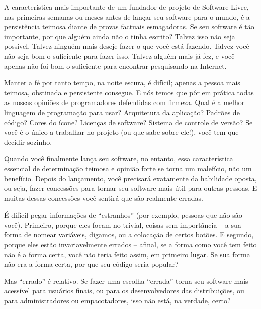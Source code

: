 

\noindent{}A característica mais importante de um fundador de projeto de Software Livre, 
nas primeiras semanas ou meses antes de lançar seu software para o mundo, é a 
persistência teimosa diante de provas factuais esmagadoras. Se seu software é tão
importante, por que alguém ainda não o tinha escrito? Talvez isso não seja possível. 
Talvez ninguém mais deseje fazer o que você está fazendo. Talvez você não seja bom o suficiente
para fazer isso. Talvez alguém mais já fez, e você apenas não foi bom o suficiente para encontrar
pesquisando na Internet.

Manter a fé por tanto tempo, na noite escura, é difícil; apenas a pessoa mais teimosa,
obstinada e persistente consegue. E nós temos que pôr em prática todas as nossas opiniões 
de programadores defendidas com firmeza. Qual é a melhor linguagem de programação para usar?
Arquitetura da aplicação? Padrões de código? Cores do ícone? Licenças de software? Sistema de
controle de versão? Se você é o único a trabalhar no projeto (ou que sabe sobre ele!), você
tem que decidir sozinho.

Quando você finalmente lança seu software, no entanto, essa característica essencial de 
determinação teimosa e opinião forte se torna um malefício, não um benefício. Depois do 
lançamento, você precisará exatamente da habilidade oposta, ou seja, fazer concessões para
tornar seu software mais útil para outras pessoas. E muitas dessas concessões você sentirá
que são realmente erradas.

É difícil pegar informações de ``estranhos'' (por exemplo, pessoas que não são você). 
Primeiro, porque eles focam no trivial, coisas sem importância -- a sua forma
de nomear variáveis, digamos, ou a colocação de certos botões. E segundo, porque eles
estão invariavelmente errados -- afinal, se a forma como você tem feito não é a forma certa,
você não teria feito assim, em primeiro lugar. Se sua forma não era a forma certa, por que
seu código seria popular?

Mas ``errado'' é relativo. Se fazer uma escolha ``errada'' torna seu software mais
acessível para usuários finais, ou para os desenvolvedores das distribuições, ou para administradores
ou empacotadores, isso não está, na verdade, certo?

